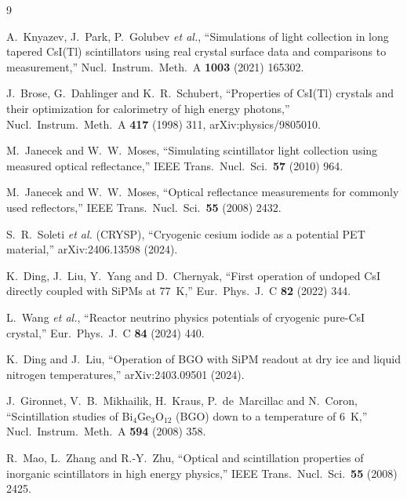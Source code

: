 \documentclass[11pt,a4paper]{article}
\begin{document}
\begin{thebibliography}{9}

A.~Knyazev, J.~Park, P.~Golubev \emph{et al.},
``Simulations of light collection in long tapered CsI(Tl) scintillators using real
crystal surface data and comparisons to measurement,''
Nucl.\ Instrum.\ Meth.\ A \textbf{1003} (2021) 165302.

J.~Brose, G.~Dahlinger and K.~R.~Schubert,
``Properties of CsI(Tl) crystals and their optimization for calorimetry of high energy
photons,''
Nucl.\ Instrum.\ Meth.\ A \textbf{417} (1998) 311, arXiv:physics/9805010.

M.~Janecek and W.~W.~Moses,
``Simulating scintillator light collection using measured optical reflectance,''
IEEE Trans.\ Nucl.\ Sci.\ \textbf{57} (2010) 964.

M.~Janecek and W.~W.~Moses,
``Optical reflectance measurements for commonly used reflectors,''
IEEE Trans.\ Nucl.\ Sci.\ \textbf{55} (2008) 2432.

S.~R.~Soleti \emph{et al.} (CRYSP),
``Cryogenic cesium iodide as a potential PET material,''
arXiv:2406.13598 (2024).

K.~Ding, J.~Liu, Y.~Yang and D.~Chernyak,
``First operation of undoped CsI directly coupled with SiPMs at 77~K,''
Eur.\ Phys.\ J.\ C \textbf{82} (2022) 344.

L.~Wang \emph{et al.},
``Reactor neutrino physics potentials of cryogenic pure-CsI crystal,''
Eur.\ Phys.\ J.\ C \textbf{84} (2024) 440.

K.~Ding and J.~Liu,
``Operation of BGO with SiPM readout at dry ice and liquid nitrogen temperatures,''
arXiv:2403.09501 (2024).

J.~Gironnet, V.~B.~Mikhailik, H.~Kraus, P.~de~Marcillac and N.~Coron,
``Scintillation studies of Bi$_4$Ge$_3$O$_{12}$ (BGO) down to a temperature of 6~K,''
Nucl.\ Instrum.\ Meth.\ A \textbf{594} (2008) 358.

R.~Mao, L.~Zhang and R.-Y.~Zhu,
``Optical and scintillation properties of inorganic scintillators in high energy
physics,''
IEEE Trans.\ Nucl.\ Sci.\ \textbf{55} (2008) 2425.

\end{thebibliography}
\end{document}
